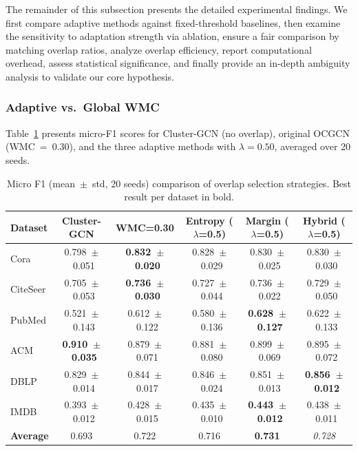 \documentclass[pdflatex,sn-mathphys-num]{sn-jnl}%
\theoremstyle{thmstyleone}%
\theoremstyle{thmstyletwo}%
\theoremstyle{thmstylethree}%
\begin{document}
The remainder of this subsection presents the detailed experimental findings. 
We first compare adaptive methods against fixed-threshold baselines, then examine the sensitivity to adaptation strength via ablation, ensure a fair comparison by matching overlap ratios, analyze overlap efficiency, report computational overhead, assess statistical significance, and finally provide an in-depth ambiguity analysis to validate our core hypothesis.

\subsubsection{Adaptive vs.\ Global WMC}
\label{subsec:adaptive-vs-global}

Table~\ref{tab:main-results} presents micro-F1 scores for Cluster-GCN (no overlap), original OCGCN (WMC~=~0.30), and the three adaptive methods with $\lambda = 0.50$, averaged over 20 seeds.

\begin{table}[ht]
\centering
\caption{Micro F1 (mean~$\pm$~std, 20 seeds) comparison of overlap selection strategies. Best result per dataset in bold.}
\label{tab:main-results}
\begin{tabular}{lccccc}
\toprule
\textbf{Dataset} & \textbf{Cluster-GCN} & \textbf{WMC=0.30} & \textbf{Entropy ($\lambda$=0.5)} & \textbf{Margin ($\lambda$=0.5)} & \textbf{Hybrid ($\lambda$=0.5)} \\
\midrule
Cora      & 0.798~$\pm$~0.051 & \textbf{0.832~$\pm$~0.020} & 0.828~$\pm$~0.029 & 0.830~$\pm$~0.025 & 0.830~$\pm$~0.030 \\
CiteSeer  & 0.705~$\pm$~0.053 & \textbf{0.736~$\pm$~0.030} & 0.727~$\pm$~0.044 & 0.736~$\pm$~0.022 & 0.729~$\pm$~0.050 \\
PubMed    & 0.521~$\pm$~0.143 & 0.612~$\pm$~0.122 & 0.580~$\pm$~0.136 & \textbf{0.628~$\pm$~0.127} & 0.622~$\pm$~0.133 \\
ACM       & \textbf{0.910~$\pm$~0.035} & 0.879~$\pm$~0.071 & 0.881~$\pm$~0.080 & 0.899~$\pm$~0.069 & 0.895~$\pm$~0.072 \\
DBLP      & 0.829~$\pm$~0.014 & 0.844~$\pm$~0.017 & 0.846~$\pm$~0.024 & 0.851~$\pm$~0.013 & \textbf{0.856~$\pm$~0.012} \\
IMDB      & 0.393~$\pm$~0.012 & 0.428~$\pm$~0.015 & 0.435~$\pm$~0.010 & \textbf{0.443~$\pm$~0.012} & 0.438~$\pm$~0.011 \\
	\textbf{Average}   & 	{0.693} & 	{0.722} & 	{0.716} & 	\textbf{0.731} & 	\textit{0.728} \\
\bottomrule
\end{tabular}
\end{table}
\end{document}
